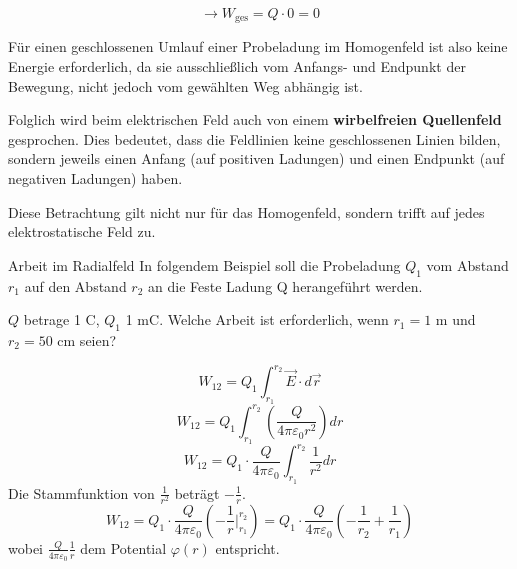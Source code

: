 \begin{frame}
{	\begin{equation*}
		\rightarrow W_\mathrm{ges} = Q \cdot 0 = 0
	\end{equation*}

	Für einen geschlossenen Umlauf einer Probeladung im Homogenfeld ist also keine Energie erforderlich,
	 da sie ausschließlich vom Anfangs- und Endpunkt der Bewegung, nicht jedoch vom gewählten Weg abhängig ist. 

	Folglich wird beim elektrischen Feld auch von einem \textbf{wirbelfreien Quellenfeld} gesprochen.
	Dies bedeutet, dass die Feldlinien keine geschlossenen Linien bilden, sondern jeweils einen Anfang (auf positiven Ladungen)
	und einen Endpunkt (auf negativen Ladungen) haben.
	
	Diese Betrachtung gilt nicht nur für das Homogenfeld, sondern trifft auf jedes elektrostatische Feld zu.



	
	


	\begin{bsp}{Arbeit im Radialfeld}{}
		In folgendem Beispiel soll die Probeladung $Q_1$ vom Abstand $r_1$ auf den Abstand $r_2$ an die Feste Ladung Q herangeführt werden.
		\begin{center}
		\end{center}

		
		
		

		$Q$ betrage 1 C, $Q_1$ 1 mC. Welche Arbeit ist erforderlich, wenn $r_1 = 1$ m und $r_2 = 50$ cm seien?

		\[
W_{12} = Q_1 \int_{r_1}^{r_2} \vec{E} \cdot d\vec{r}
\]
\[
W_{12} = Q_1 \int_{r_1}^{r_2} \left( \frac{Q}{4 \pi \varepsilon_0 r^2} \right) dr
\]
\[
W_{12} = Q_1 \cdot \frac{Q}{4 \pi \varepsilon_0} \int_{r_1}^{r_2} \frac{1}{r^2} dr
\]
Die Stammfunktion von $\frac{1}{r^2}$ beträgt $-\frac{1}{r}$.
\[
W_{12} = Q_1 \cdot \frac{Q}{4 \pi \varepsilon_0} \left( -\frac{1}{r} \bigg|_{r_1}^{r_2} \right) = Q_1 \cdot \frac{Q}{4 \pi \varepsilon_0} \left( -\frac{1}{r_2} + \frac{1}{r_1} \right)
\]
wobei $\frac{Q}{4 \pi \varepsilon_0} \frac{1}{r}$ dem Potential $\varphi(r)$ entspricht.


\end{bsp}}
\end{frame}
